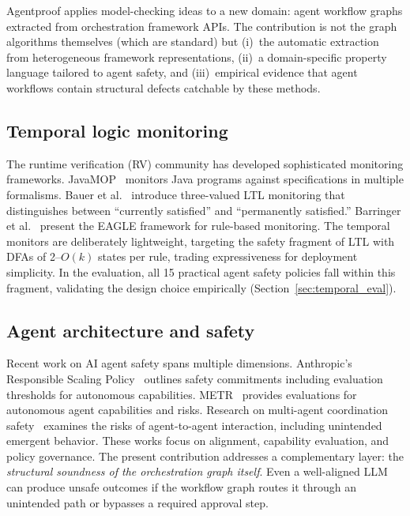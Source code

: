 

Agentproof applies model-checking ideas to a new domain: agent
workflow graphs extracted from orchestration framework APIs. The
contribution is not the graph algorithms themselves (which are
standard) but (i)~the automatic extraction from heterogeneous
framework representations, (ii)~a domain-specific property language
tailored to agent safety, and (iii)~empirical evidence that agent
workflows contain structural defects catchable by these methods.

\subsection{Temporal logic monitoring}

The runtime verification (RV) community has developed sophisticated
monitoring frameworks.
JavaMOP~\citep{javamop} monitors Java programs against specifications
in multiple formalisms.
Bauer et al.~\citep{bauer2011ltl3} introduce three-valued LTL
monitoring that distinguishes between ``currently satisfied'' and
``permanently satisfied.''
Barringer et al.~\citep{barringer2004eagle} present the EAGLE framework
for rule-based monitoring.
The temporal monitors are deliberately lightweight, targeting the safety
fragment of LTL with DFAs of 2--$O(k)$ states per rule, trading
expressiveness for deployment simplicity. In the evaluation, all 15
practical agent safety policies fall within this fragment, validating the
design choice empirically (Section~\ref{sec:temporal_eval}).

\subsection{Agent architecture and safety}

Recent work on AI agent safety spans multiple dimensions.
Anthropic's Responsible Scaling Policy~\citep{anthropic_rsp} outlines
safety commitments including evaluation thresholds for autonomous
capabilities.
METR~\citep{metr} provides evaluations for autonomous agent
capabilities and risks.
Research on multi-agent coordination safety~\citep{gabriel2024ethics}
examines the risks of agent-to-agent interaction, including unintended
emergent behavior.
These works focus on alignment, capability evaluation, and policy
governance. The present contribution addresses a complementary layer: the
\emph{structural soundness of the orchestration graph itself}. Even a
well-aligned LLM can produce unsafe outcomes if the workflow graph
routes it through an unintended path or bypasses a required approval
step.

